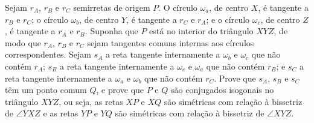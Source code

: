 Sejam $r_A$, $r_B$ e $r_C$ semirretas de origem $P$. O círculo $\omega_a$, de centro $X$, é tangente a $r_B$ e $r_C$; o círculo $\omega_b$, de centro $Y$, é tangente a $r_C$ e $r_A$; e o círculo $\omega_c$, de centro $Z$, é tangente a $r_A$ e $r_B$.  Suponha que $P$ está no interior do triângulo $XYZ$, de modo que $r_A$, $r_B$ e $r_C$ sejam tangentes comuns internas aos círculos correspondentes. Sejam $s_A$ a reta tangente internamente a $\omega_b$ e $\omega_c$ que não contém $r_A$; $s_B$ a reta tangente internamente a $\omega_c$ e $\omega_a$ que não contém $r_B$; e $s_C$ a reta tangente internamente a $\omega_a$ e $\omega_b$ que não contém $r_C$. Prove que $s_A$, $s_B$ e $s_C$ têm um ponto comum $Q$, e prove que $P$ e $Q$ são conjugados isogonais no triângulo $XYZ$, ou seja, as retas $XP$ e $XQ$ são simétricas com relação à bissetriz de $\angle YXZ$ e as retas $YP$ e $YQ$ são simétricas com relação à bissetriz de $\angle XYZ$.

